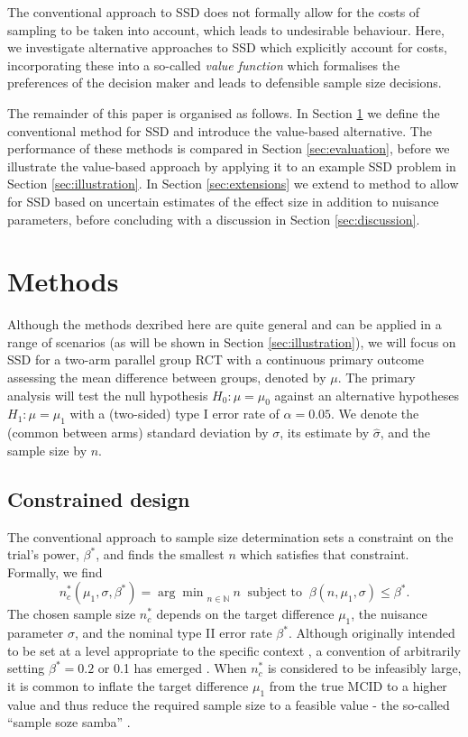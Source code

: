 \documentclass[sagev, Crown]{sagej}
\begin{document}
The conventional approach to SSD does not formally allow for the costs of sampling to be taken into account, which leads to undesirable behaviour. Here, we investigate alternative approaches to SSD which explicitly account for costs, incorporating these into a so-called \emph{value function} which formalises the preferences of the decision maker and leads to defensible sample size decisions.

The remainder of this paper is organised as follows. In Section \ref{sec:methods} we define the conventional method for SSD and introduce the value-based alternative. The performance of these methods is compared in Section \ref{sec:evaluation}, before we illustrate the value-based approach by applying it to an example SSD problem in Section \ref{sec:illustration}. In Section \ref{sec:extensions} we extend to method to allow for SSD based on uncertain estimates of the effect size in addition to nuisance parameters, before concluding with a discussion in Section \ref{sec:discussion}.

\section{Methods}\label{sec:methods}

Although the methods dexribed here are quite general and can be applied in a range of scenarios (as will be shown in Section \ref{sec:illustration}), we will focus on SSD for a two-arm parallel group RCT with a continuous primary outcome assessing the mean difference between groups, denoted by $\mu$. The primary analysis will test the null hypothesis $H_0: \mu = \mu_0$ against an alternative hypotheses $H_1: \mu = \mu_1$ with a (two-sided) type I error rate of $\alpha = 0.05$. We denote the (common between arms) standard deviation by $\sigma$, its estimate by $\hat{\sigma}$, and the sample size by $n$.

\subsection{Constrained design}

The conventional approach to sample size determination sets a constraint on the trial's power, $\beta^*$, and finds the smallest $n$ which satisfies that constraint. Formally, we find
\begin{equation}
n^*_c (\mu_1, \sigma, \beta^*) = {\arg\min}_{n \in \mathbb{N}}~ n ~\text{ subject to } ~ \beta(n, \mu_1, \sigma) \leq \beta^*.
\end{equation}
The chosen sample size $n^*_c$ depends on the target difference $\mu_1$, the nuisance parameter $\sigma$, and the nominal type II error rate $\beta^*$. Although originally intended to be set at a level appropriate to the specific context \cite{Neyman1933}, a convention of arbitrarily setting $\beta^* = 0.2$ or 0.1 has emerged \cite{Bacchetti2019}. When $n^*_c$ is considered to be infeasibly large, it is common to inflate the target difference $\mu_1$ from the true MCID to a higher value and thus reduce the required sample size to a feasible value - the so-called ``sample soze samba'' \cite{Schulz2005}.
\end{document}
